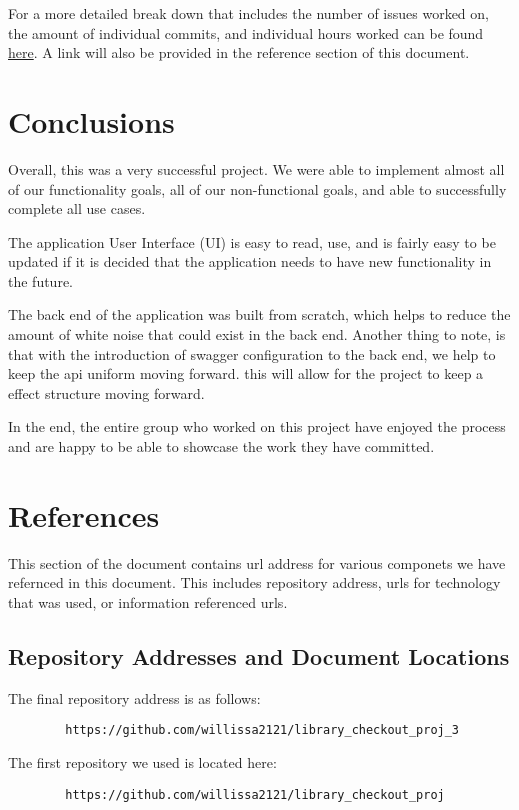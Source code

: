 \documentclass{article}
\begin{document}
	For a more detailed break down that includes the number of issues worked on, the amount of individual commits, and individual hours worked can be found \href{https://tinyurl.com/2p9f8js9}{here}. A link will also be provided in the reference section of this document.
	
	\section{Conclusions}
	
	Overall, this was a very successful project. We were able to implement almost all of our functionality goals, all of our non-functional goals, and able to successfully complete all use cases.
	
	The application User Interface (UI) is easy to read, use, and is fairly easy to be updated if it is decided that the application needs to have new functionality in the future.
	
	The back end of the application was built from scratch, which helps to reduce the amount of white noise that could exist in the back end. Another thing to note, is that with the introduction of swagger configuration to the back end, we help to keep the api uniform moving forward. this will allow for the project to keep a effect structure moving forward.
	
	In the end, the entire group who worked on this project have enjoyed the process and are happy to be able to showcase the work they have committed.
	
	\section{References}
	
	This section of the document contains url address for various componets we have refernced in this document. This includes repository address, urls for technology that was used, or information referenced urls.
	
	\subsection{Repository Addresses and Document Locations}
	
	The final repository address is as follows: 
	\begin{verbatim}
		https://github.com/willissa2121/library_checkout_proj_3
	\end{verbatim}

	The first repository we used is located here:
	\begin{verbatim}
		https://github.com/willissa2121/library_checkout_proj
	\end{verbatim}
\end{document}

